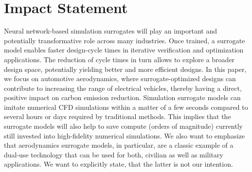 \section{Impact Statement}
Neural network-based simulation surrogates will play an important and potentially transformative role across many industries. 
Once trained, a surrogate model enables faster design-cycle times in iterative verification and optimization applications. 
The reduction of cycle times in turn allows to explore a broader design space, potentially yielding better and more efficient designs. 
In this paper, we focus on automotive aerodynamics, where surrogate-optimized designs can contribute to increasing the range of electrical vehicles, thereby having a direct, positive impact on carbon emission reduction. 
Simulation surrogate models can imitate numerical \ac{CFD} simulations within a matter of a few seconds compared to several hours or days required by traditional methods. 
This implies that the surrogate models will also help to save compute (orders of magnitude) currently still invested into high-fidelity numerical simulations. 
We also want to emphasize that aerodynamics surrogate models, in particular, are a classic example of a dual-use technology that can be used for both, civilian as well as military applications.
We want to explicitly state, that the latter is not our intention.

